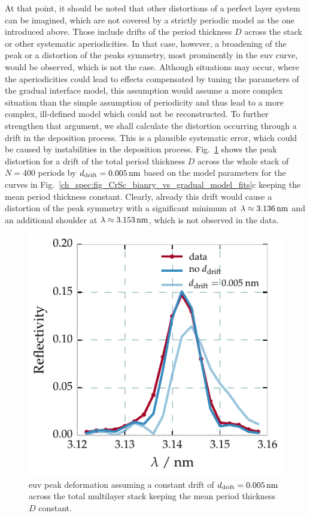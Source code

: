At that point, it should be noted that other distortions of a perfect layer system can be imagined, which are not covered by a strictly periodic model as the one introduced above. Those include drifts of the period thickness $D$ across the stack or other systematic aperiodicities. In that case, however, a broadening of the peak or a distortion of the peaks symmetry, most prominently in the \gls{euv} curve, would be observed, which is not the case. Although situations may occur, where the aperiodicities could lead to effects compensated by tuning the parameters of the gradual interface model, this assumption would assume a more complex situation than the simple assumption of periodicity and thus lead to a more complex, ill-defined model which could not be reconstructed.
To further strengthen that argument, we shall calculate the distortion occurring through a drift in the deposition process. This is a plausible systematic error, which could be caused by instabilities in the deposition process. Fig.~\ref{ch_spec:fig_CrSc_drift} shows the peak distortion for a drift of the total period thickness $D$ across the whole stack of $N=400$ periods by $d_\text{drift} = \nm{0.005}$ based on the model parameters for the curves in Fig.~\ref{ch_spec:fig_CrSc_bianry_vs_gradual_model_fits}c keeping the mean period thickness constant. Clearly, already this drift would cause a distortion of the peak symmetry with a significant minimum at $\lambda \approx \nm{3.136}$ and an additional shoulder at $\lambda \approx \nm{3.153}$, which is not observed in the data.
\begin{figure}[htbp]
  \centering
  \includegraphics{img/CrSc_drift}
  \caption{\Gls{euv} peak deformation assuming a constant drift of $d_\text{drift} = \nm{0.005}$ across the total multilayer stack keeping the mean period thickness $D$ constant.}
  \label{ch_spec:fig_CrSc_drift}
\end{figure}

